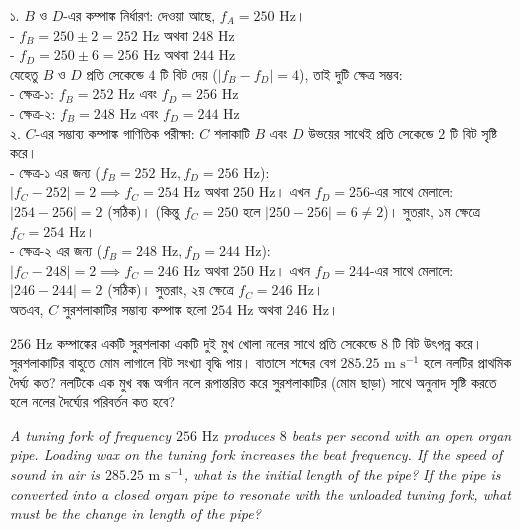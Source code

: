 \documentclass[12pt, a4paper]{article}
\begin{document}
\begin{tcolorbox}[solutionbox={সমাধান (Solution)}]
\noindent
১. $B$ ও $D$-এর কম্পাঙ্ক নির্ধারণ: দেওয়া আছে, $f_A = 250\text{ Hz}$। \\
- $f_B = 250 \pm 2 = 252\text{ Hz}$ অথবা $248\text{ Hz}$ \\
- $f_D = 250 \pm 6 = 256\text{ Hz}$ অথবা $244\text{ Hz}$ \\
যেহেতু $B$ ও $D$ প্রতি সেকেন্ডে $4$ টি বিট দেয় ($|f_B - f_D| = 4$), তাই দুটি ক্ষেত্র সম্ভব: \\
- ক্ষেত্র-১: $f_B = 252\text{ Hz}$ এবং $f_D = 256\text{ Hz}$ \\
- ক্ষেত্র-২: $f_B = 248\text{ Hz}$ এবং $f_D = 244\text{ Hz}$ \\
২. $C$-এর সম্ভাব্য কম্পাঙ্ক গাণিতিক পরীক্ষা: $C$ শলাকাটি $B$ এবং $D$ উভয়ের সাথেই প্রতি সেকেন্ডে $2$ টি বিট সৃষ্টি করে। \\
- ক্ষেত্র-১ এর জন্য ($f_B = 252\text{ Hz}, f_D = 256\text{ Hz}$): \\
$|f_C - 252| = 2 \implies f_C = 254\text{ Hz}$ অথবা $250\text{ Hz}$। এখন $f_D = 256$-এর সাথে মেলালে: $|254 - 256| = 2$ (সঠিক)। (কিন্তু $f_C = 250$ হলে $|250 - 256| = 6 \neq 2$)। সুতরাং, ১ম ক্ষেত্রে $f_C = 254\text{ Hz}$। \\
- ক্ষেত্র-২ এর জন্য ($f_B = 248\text{ Hz}, f_D = 244\text{ Hz}$): \\
$|f_C - 248| = 2 \implies f_C = 246\text{ Hz}$ অথবা $250\text{ Hz}$। এখন $f_D = 244$-এর সাথে মেলালে: $|246 - 244| = 2$ (সঠিক)। সুতরাং, ২য় ক্ষেত্রে $f_C = 246\text{ Hz}$। \\
অতএব, $C$ সুরশলাকাটির সম্ভাব্য কম্পাঙ্ক হলো $254\text{ Hz}$ অথবা $246\text{ Hz}$।
\end{tcolorbox}

\vspace{1.5em}

\begin{tcolorbox}[questionbox={প্রশ্ন (Question) 5}]
\noindent
$256\text{ Hz}$ কম্পাঙ্কের একটি সুরশলাকা একটি দুই মুখ খোলা নলের সাথে প্রতি সেকেন্ডে $8$ টি বিট উৎপন্ন করে। সুরশলাকাটির বাহুতে মোম লাগালে বিট সংখ্যা বৃদ্ধি পায়। বাতাসে শব্দের বেগ $285.25\text{ m s}^{-1}$ হলে নলটির প্রাথমিক দৈর্ঘ্য কত? নলটিকে এক মুখ বন্ধ অর্গান নলে রূপান্তরিত করে সুরশলাকাটির (মোম ছাড়া) সাথে অনুনাদ সৃষ্টি করতে হলে নলের দৈর্ঘ্যের পরিবর্তন কত হবে?

\vspace{0.8em}
\begin{english}
\noindent\textit{\color{darkgray}
A tuning fork of frequency $256\text{ Hz}$ produces $8$ beats per second with an open organ pipe. Loading wax on the tuning fork increases the beat frequency. If the speed of sound in air is $285.25\text{ m s}^{-1}$, what is the initial length of the pipe? If the pipe is converted into a closed organ pipe to resonate with the unloaded tuning fork, what must be the change in length of the pipe?
}
\end{english}
\end{tcolorbox}
\end{document}
